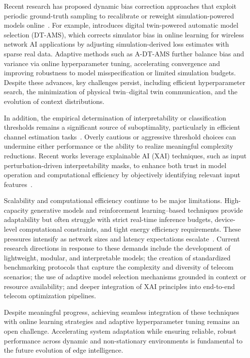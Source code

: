 \documentclass[sigconf]{acmart}
\begin{document}
Recent research has proposed dynamic bias correction approaches that exploit periodic ground-truth sampling to recalibrate or reweight simulation-powered models online~\cite{ref37,ref38}. For example, \cite{ref37} introduces digital twin-powered automatic model selection (DT-AMS), which corrects simulator bias in online learning for wireless network AI applications by adjusting simulation-derived loss estimates with sparse real data. Adaptive methods such as A-DT-AMS further balance bias and variance via online hyperparameter tuning, accelerating convergence and improving robustness to model misspecification or limited simulation budgets. Despite these advances, key challenges persist, including efficient hyperparameter search, the minimization of physical twin–digital twin communication, and the evolution of context distributions.

In addition, the empirical determination of interpretability or classification thresholds remains a significant source of suboptimality, particularly in efficient channel estimation tasks~\cite{ref41}. Overly cautious or aggressive threshold choices can undermine either performance or the ability to realize meaningful complexity reductions. Recent works leverage explainable AI (XAI) techniques, such as input perturbation-driven interpretability masks, to enhance both trust in model operation and computational efficiency by objectively identifying relevant input features~\cite{ref38,ref41}.

Scalability and computational efficiency continue to be major limitations. High-capacity generative models and reinforcement learning–based techniques provide adaptability but often struggle with strict real-time inference budgets, device-level computational constraints, and tight energy efficiency requirements. These pressures intensify as network sizes and latency expectations escalate~\cite{ref43,ref44,ref48}. Current research directions in response to these demands include the development of lightweight, modular, and interpretable models; the creation of standardized benchmarking protocols that capture the complexity and diversity of telecom scenarios; the use of adaptive model selection mechanisms grounded in context or resource availability; and deeper integration of XAI principles into end-to-end telecom optimization pipelines.

Despite meaningful progress, achieving seamless integration of these techniques with online learning strategies and adaptive hyperparameter tuning remains an open challenge. Accelerating system adaptation while ensuring reliable, robust performance across dynamic and non-stationary environments is fundamental to the future evolution of edge intelligence.
\end{document}
